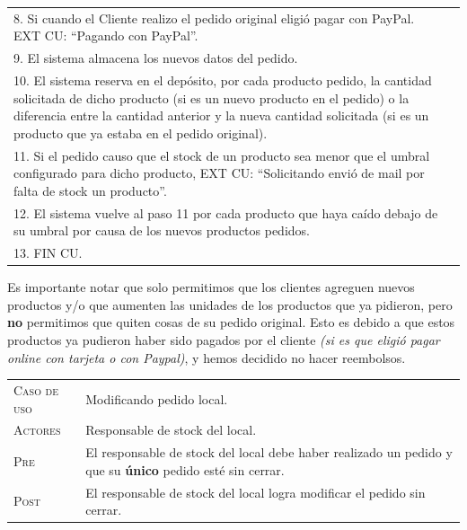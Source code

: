 \begin{center}
\begin{tabular}{|p{}|p{}|}
	8. Si cuando el Cliente realizo el pedido original eligió pagar con PayPal. EXT CU: ``Pagando con PayPal''. & \\
	9. El sistema almacena los nuevos datos del pedido. & \\
	10. El sistema reserva en el depósito, por cada producto pedido, la cantidad solicitada de dicho producto (si es un nuevo producto en el pedido) o la diferencia entre la cantidad anterior y la nueva cantidad solicitada (si es un producto que ya estaba en el pedido original). & \\
	11. Si el pedido causo que el stock de un producto sea menor que el umbral configurado para dicho producto, EXT CU: ``Solicitando envió de mail por falta de stock un producto''. & \\
	12. El sistema vuelve al paso 11 por cada producto que haya caído debajo de su umbral por causa de los nuevos productos pedidos. & \\
	13. FIN CU. & \\
    \hline
\end{tabular}
\end{center}
Es importante notar que solo permitimos que los clientes agreguen nuevos productos y/o que aumenten las unidades de los productos que ya pidieron, pero \textbf{no} permitimos que quiten cosas de su pedido original. Esto es debido a que estos productos ya pudieron haber sido pagados por el cliente \textit{(si es que eligió pagar online con tarjeta o con Paypal)}, y hemos decidido no hacer reembolsos.


\newpage

\begin{tabular}{p{} p{}}
    \textsc{Caso de uso} & Modificando pedido local. \\
    \textsc{Actores} & Responsable de stock del local. \\
    \textsc{Pre} & El responsable de stock del local debe haber realizado un pedido y
    que su \textbf{único} pedido esté sin cerrar. \\
    \textsc{Post} & El responsable de stock del local logra modificar el pedido sin cerrar.
    \\
\end{tabular}

